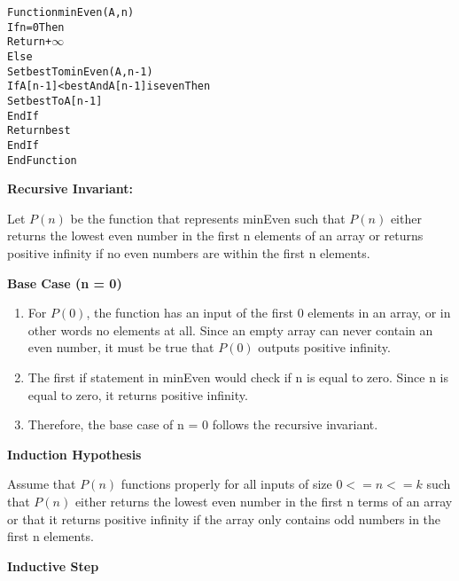 \documentclass[12pt]{article}
\begin{document}
\begin{alltt}
Function minEven(A,n)
  If n = 0 Then
    Return +\ensuremath{\infty}
  Else
    Set best To minEven(A,n-1)
    If A[n-1] < best And A[n-1] is even Then
      Set best To A[n-1]
    EndIf
    Return best
  EndIf
EndFunction
\end{alltt}


\textbf{Recursive Invariant:}

Let $P(n)$ be the function that represents minEven such that $P(n)$ either returns the lowest even number in the first n elements of an array or returns positive infinity
if no even numbers are within the first n elements. 

\bigskip
\textbf{Base Case (n = 0)}
\begin{enumerate}
    \item For $P(0)$, the function has an input of the first 0 elements in an array, or in other words no elements at all. 
    Since an empty array can never contain an even number, it must be true that $P(0)$ outputs positive infinity. 
    \item The first if statement in minEven would check if n is equal to zero. Since n is equal to zero, it returns positive infinity. 
    \item Therefore, the base case of n = 0 follows the recursive invariant.
\end{enumerate}

\bigskip
\textbf{Induction Hypothesis}

Assume that $P(n)$ functions properly for all inputs of size $0 <= n <= k$ such that $P(n)$ either returns the lowest even number in the 
first n terms of an array or that it returns positive infinity if the array only contains odd numbers in the first n elements. 

\bigskip
\textbf{Inductive Step}
\end{document}
